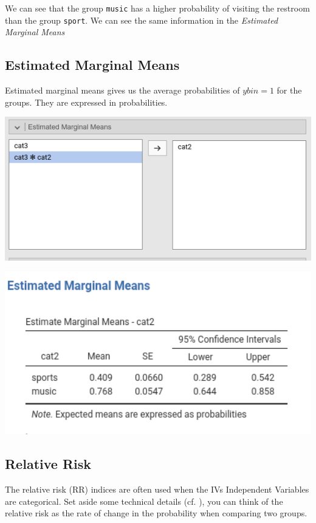 \documentclass[
]{book}
\begin{document}
We can see that the group \texttt{music} has a higher probability of visiting the restroom than the group \texttt{sport}. We can see the same information in the \emph{Estimated Marginal Means}

\hypertarget{estimated-marginal-means-1}{%
\subsection{Estimated Marginal Means}\label{estimated-marginal-means-1}}

Estimated marginal means gives us the average probabilities of \(ybin=1\) for the groups. They are expressed in probabilities.

\includegraphics[width=7.72in]{bookletpics/3_logistic_input7}

\includegraphics[width=5.57in]{bookletpics/3_logistic_output9}

\hypertarget{relative-risk}{%
\subsection{Relative Risk}\label{relative-risk}}

The relative risk (RR) indices are often used when the {IVs {Independent Variables} } are categorical. Set aside some technical details (cf. \citet{zou2004modified}), you can think of the relative risk as the rate of change in the probability when comparing two groups.
\end{document}
